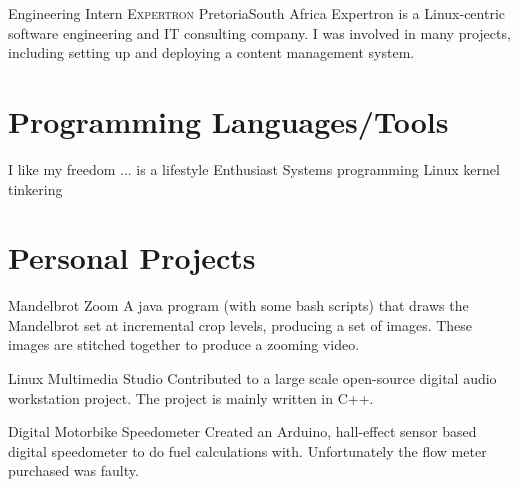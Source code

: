 \documentclass[11pt,a4paper,sans]{moderncv}
\begin{document}
{Engineering Intern}
{\textsc{Expertron}}
{\newline Pretoria}{South Africa}
{Expertron is a Linux-centric software engineering and IT consulting company. I
was involved in many projects, including setting up and deploying a content
management system.}


\section{Programming Languages/Tools}

{{\normalfont I like my freedom}}
{}
{{\normalfont ... is a lifestyle}}
{}
{{\normalfont Enthusiast}}
{}
{{\normalfont Systems programming}}
{}
{{\normalfont Linux kernel tinkering}}
{}


\section{Personal Projects}

{Mandelbrot Zoom}
{}
{}{}
{A java program (with some bash scripts) that draws the Mandelbrot set at
incremental crop levels, producing a set of images. These images are stitched
together to produce a zooming video.}

{Linux Multimedia Studio}
{}
{}{}
{Contributed to a large scale open-source digital audio workstation project. The
project is mainly written in C++.}

{Digital Motorbike Speedometer}
{}
{}{}
{Created an Arduino, hall-effect sensor based digital speedometer to do fuel
calculations with. Unfortunately the flow meter purchased was faulty.}
\end{document}
